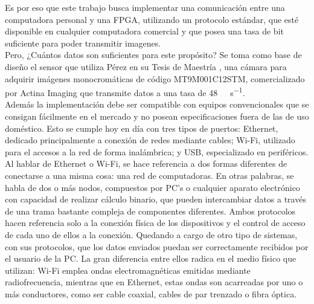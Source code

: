 Es por eso que este trabajo busca implementar una comunicación entre una computadora personal y una FPGA, utilizando un protocolo estándar, que esté disponible en cualquier computadora comercial y que posea una tasa de bit suficiente para poder transmitir imagenes.\\




Pero, ¿Cuántos datos son suficientes para este propósito? Se toma como base de diseño el sensor que utiliza Pérez en su Tesis de Maestría \cite{Perez2018}, una cámara para adquirir imágenes monocromáticas de código MT9M001C12STM, comercializado por Actina Imaging \cite{MicronTechnology2004} que transmite datos a una tasa de \SI{48}{\mega\bit\per\second}.\\

Además la implementación debe ser compatible con equipos convencionales que se consigan fácilmente en el mercado y no posean especificaciones fuera de las de uso doméstico. Esto se cumple hoy en día con tres tipos de puertos: Ethernet, dedicado principalmente a conexión de redes mediante cables; Wi-Fi, utilizado para el accesos a la red de forma inalámbrica; y USB, especializado en periféricos.\\

Al hablar de Ethernet o Wi-Fi, se hace referencia a dos formas diferentes de conectarse a una misma cosa: una red de computadoras. En otras palabras, se habla de dos o más nodos, compuestos por PC's o cualquier aparato electrónico con capacidad de realizar cálculo binario, que pueden intercambiar datos a través de una trama bastante compleja de componentes diferentes. Ambos protocolos hacen referencia solo a la conexión física de los dispositivos y el control de acceso de cada uno de ellos a la conexión. Quedando a cargo de otro tipo de sistemas, con sus protocolos, que los datos enviados puedan ser correctamente recibidos por el usuario de la PC. La gran diferencia entre ellos radica en el medio físico que utilizan: Wi-Fi emplea ondas electromagnéticas emitidas mediante radiofrecuencia, mientras que en Ethernet, estas ondas son acarreadas por uno o más conductores, como ser cable coaxial, cables de par trenzado o fibra óptica.\\

